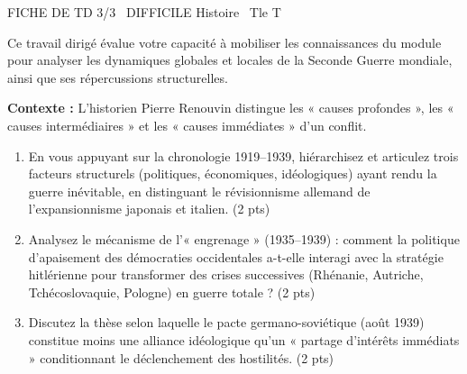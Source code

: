 \documentclass[11pt]{article}
\begin{document}
\begin{tcolorbox}[enhanced,colback=popink,colframe=popink,arc=10pt,boxrule=0pt,left=12pt,right=12pt,top=9pt,bottom=9pt]
{\color{white}\popxbold\small FICHE DE TD 3/3 \textbullet\ DIFFICILE \hfill Histoire \textbullet\ Tle T\par}
\end{tcolorbox}
\vspace{4pt}
Ce travail dirigé évalue votre capacité à mobiliser les connaissances du module pour analyser les dynamiques globales et locales de la Seconde Guerre mondiale, ainsi que ses répercussions structurelles.

\begin{exercice}
    \textbf{Contexte :} L'historien Pierre Renouvin distingue les « causes profondes », les « causes intermédiaires » et les « causes immédiates » d'un conflit.
    \begin{enumerate}
        \item En vous appuyant sur la chronologie 1919--1939, hiérarchisez et articulez trois facteurs structurels (politiques, économiques, idéologiques) ayant rendu la guerre inévitable, en distinguant le révisionnisme allemand de l'expansionnisme japonais et italien. (2 pts)
        \item Analysez le mécanisme de l'« engrenage » (1935--1939) : comment la politique d'apaisement des démocraties occidentales a-t-elle interagi avec la stratégie hitlérienne pour transformer des crises successives (Rhénanie, Autriche, Tchécoslovaquie, Pologne) en guerre totale ? (2 pts)
        \item Discutez la thèse selon laquelle le pacte germano-soviétique (août 1939) constitue moins une alliance idéologique qu'un « partage d'intérêts immédiats » conditionnant le déclenchement des hostilités. (2 pts)
    \end{enumerate}
\end{exercice}
\end{document}
